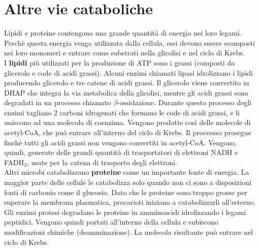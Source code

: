 \section{Altre vie cataboliche}
Lipidi e proteine contengono una grande quantit\`a di energia nei loro legami. Perch\`e questa energia venga utilizzata dalla cellula, essi devono essere scomposti nei loro monomeri e entrare come substrati nella glicolisi e nel ciclo di Krebs.
\\I \textbf{lipidi} pi\`u utilizzati per la produzione di ATP sono i grassi (composti da glicerolo e code di acidi grassi). Alcuni enzimi chiamati lipasi idrolizzano i lipidi producendo glicerolo e tre catene di acidi grassi. Il glicerolo viene convertito in DHAP che integra la via metabolica della glicolisi, mentre gli acidi grassi sono degradati in un processo chiamato $\beta$-ossidazione. 
Durante questo processo degli enzimi tagliano 2 carboni idrogenati che formano le code di acidi grassi, e li uniscono ad una molecola di coenzima. Vengono prodotte cos\`i delle molecole di acetyl-CoA, che pu\`o entrare all'interno del ciclo di Krebs. Il proccesso prosegue finch\`e tutti gli acidi grassi non vengono convertiti in acetyl-CoA. Vengono, quindi, generate delle grandi quantit\`a di trasportatori di elettroni NADH e FADH$_2$, usate per la catena di trasporto degli elettroni.
\\Altri microbi catabolizzano \textbf{proteine} come un importante fonte di energia. La maggior parte delle cellule le catabolizza solo quando non ci sono a disposizioni fonti di carbonio come il glucosio. Dato che le proteine sono troppo grosse per superare la membrana plasmatica, procarioti iniziano a catabolizzarli all'esterno. Gli enzimi protesi degradano le proteine in amminoacidi idrolizzando i legami peptidici. Vengono quindi portati all'interno della cellula e subiscono modificazioni chimiche (deamminazione). La molecola risultante pu\`o entrare nel ciclo di Krebs.
